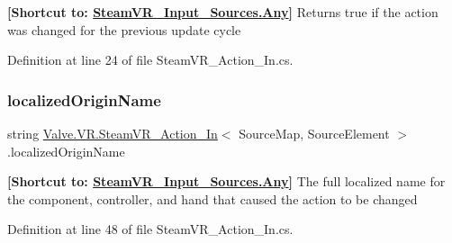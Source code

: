 {\bfseries{\mbox{[}Shortcut to\+: \mbox{\hyperlink{namespace_valve_1_1_v_r_a82e5bf501cc3aa155444ee3f0662853faed36a1ef76a59ee3f15180e0441188ad}{Steam\+V\+R\+\_\+\+Input\+\_\+\+Sources.\+Any}}\mbox{]}}} Returns true if the action was changed for the previous update cycle 



Definition at line 24 of file Steam\+V\+R\+\_\+\+Action\+\_\+\+In.\+cs.

\mbox{\label{class_valve_1_1_v_r_1_1_steam_v_r___action___in_a400ef60ea3cecf1cd50d8da97a00d13b}} 
\subsubsection{\texorpdfstring{localizedOriginName}{localizedOriginName}}
{\footnotesize\ttfamily string \mbox{\hyperlink{class_valve_1_1_v_r_1_1_steam_v_r___action___in}{Valve.\+V\+R.\+Steam\+V\+R\+\_\+\+Action\+\_\+\+In}}$<$ Source\+Map, Source\+Element $>$.localized\+Origin\+Name\hspace{0.3cm}{\ttfamily [get]}}



{\bfseries{\mbox{[}Shortcut to\+: \mbox{\hyperlink{namespace_valve_1_1_v_r_a82e5bf501cc3aa155444ee3f0662853faed36a1ef76a59ee3f15180e0441188ad}{Steam\+V\+R\+\_\+\+Input\+\_\+\+Sources.\+Any}}\mbox{]}}} The full localized name for the component, controller, and hand that caused the action to be changed 



Definition at line 48 of file Steam\+V\+R\+\_\+\+Action\+\_\+\+In.\+cs.

\mbox{\label{class_valve_1_1_v_r_1_1_steam_v_r___action___in_af302f79ecf325f6507a3aca1de536097}} 
